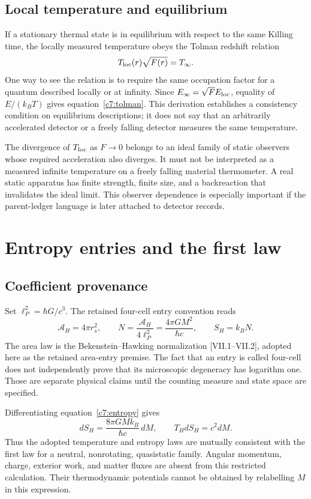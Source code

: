 \subsection{Local temperature and equilibrium}
If a stationary thermal state is in equilibrium with respect to the same Killing time, the locally measured temperature obeys the Tolman redshift relation
\begin{equation}
 T_{\rm loc}(r)\sqrt{F(r)}=T_\infty.
 \label{c7:tolman}
\end{equation}
One way to see the relation is to require the same occupation factor for a quantum described locally or at infinity. Since $E_\infty=\sqrt F E_{\rm loc}$, equality of $E/(k_BT)$ gives equation~\eqref{c7:tolman}. This derivation establishes a consistency condition on equilibrium descriptions; it does not say that an arbitrarily accelerated detector or a freely falling detector measures the same temperature.

The divergence of $T_{\rm loc}$ as $F\to0$ belongs to an ideal family of static observers whose required acceleration also diverges. It must not be interpreted as a measured infinite temperature on a freely falling material thermometer. A real static apparatus has finite strength, finite size, and a backreaction that invalidates the ideal limit. This observer dependence is especially important if the parent-ledger language is later attached to detector records.

\section{Entropy entries and the first law}
\subsection{Coefficient provenance}
Set $\ell_P^2=\hbar G/c^3$. The retained four-cell entry convention reads
\begin{equation}
 \mathcal A_H=4\pi r_s^2,\qquad
 N=\frac{\mathcal A_H}{4\ell_P^2}
   =\frac{4\pi GM^2}{\hbar c},\qquad
 S_H=k_BN.
 \label{c7:entropy}
\end{equation}
The area law is the Bekenstein--Hawking normalization [VII.1--VII.2], adopted here as the retained area-entry premise. The fact that an entry is called four-cell does not independently prove that its microscopic degeneracy has logarithm one. Those are separate physical claims until the counting measure and state space are specified.

Differentiating equation~\eqref{c7:entropy} gives
\begin{equation}
 dS_H=\frac{8\pi GMk_B}{\hbar c}\,dM,
 \qquad T_HdS_H=c^2dM.
 \label{c7:firstlaw}
\end{equation}
Thus the adopted temperature and entropy laws are mutually consistent with the first law for a neutral, nonrotating, quasistatic family. Angular momentum, charge, exterior work, and matter fluxes are absent from this restricted calculation. Their thermodynamic potentials cannot be obtained by relabelling $M$ in this expression.

